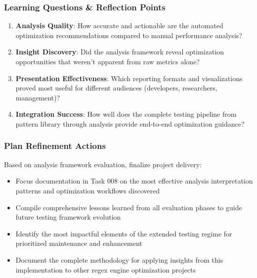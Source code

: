 \documentclass[11pt,a4paper]{article}
\begin{document}
\subsubsection{Learning Questions \& Reflection Points}
\begin{enumerate}
    \item \textbf{Analysis Quality}: How accurate and actionable are the automated optimization recommendations compared to manual performance analysis?
    \item \textbf{Insight Discovery}: Did the analysis framework reveal optimization opportunities that weren't apparent from raw metrics alone?
    \item \textbf{Presentation Effectiveness}: Which reporting formats and visualizations proved most useful for different audiences (developers, researchers, management)?
    \item \textbf{Integration Success}: How well does the complete testing pipeline from pattern library through analysis provide end-to-end optimization guidance?
\end{enumerate}

\subsubsection{Plan Refinement Actions}
Based on analysis framework evaluation, finalize project delivery:
\begin{itemize}
    \item Focus documentation in Task 008 on the most effective analysis interpretation patterns and optimization workflows discovered
    \item Compile comprehensive lessons learned from all evaluation phases to guide future testing framework evolution
    \item Identify the most impactful elements of the extended testing regime for prioritized maintenance and enhancement
    \item Document the complete methodology for applying insights from this implementation to other regex engine optimization projects
\end{itemize}

\end{document}
